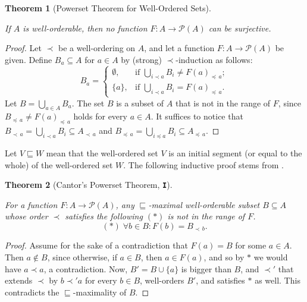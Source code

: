 \documentclass[12pt]{article}
\newtheorem{theorem}{Theorem}[]
\begin{document}
\begin{theorem}[Powerset Theorem for Well-Ordered Sets]
\,

\noindent
  If $A$ is well-orderable, then no function $F\colon A\rightarrow\mathscr{P}(A)$ can be surjective.
\end{theorem}

\begin{proof}

\noindent
Let $\prec$ be a well-ordering on $A$, and let a function $F\colon A\rightarrow\mathscr{P}(A)$ be given. Define  $B_a\subseteq A$ for $a\in A$ by (strong) $\prec$-induction as follows: $$B_a=\begin{cases}
                  \emptyset, & \mbox{if }  \bigcup_{i\prec a}B_i \neq F(a)_{\preccurlyeq\,a}; \\
                 \{a\}, & \mbox{if }  \bigcup_{i\prec a}B_i = F(a)_{\preccurlyeq\,a}.
               \end{cases}$$
Let $B=\bigcup_{a\in A}B_a$. The set $B$ is a subset of $A$ that is not in the range of $F$, since $B_{\preccurlyeq\,a}\neq F(a)_{\preccurlyeq\,a}$ holds for every $a\in A$. It suffices to notice that
$B_{\prec\,a}=\bigcup_{i\prec a}B_i\subseteq A_{\prec\,a}$ and
$B_{\preccurlyeq\,a}=\bigcup_{i\preccurlyeq a}B_i\subseteq A_{\preccurlyeq\,a}$.
\end{proof}

Let $V\sqsubseteq W$ mean that the well-ordered set $V$ is an initial segment (or equal to the whole) of the well-ordered set $W$.
The following inductive proof stems from \textbf{\cite{B97}}.



\begin{theorem}[Cantor's Powerset Theorem, \texttt{\textbf{I}}]
\,

\noindent
For a function $F\colon A\rightarrow\mathscr{P}(A)$, any $\sqsubseteq$-maximal well-orderable subset $B\subseteq A$ whose order $\prec$   satisfies the following $(\boldsymbol\ast)$ is not in the range of $F$.
$$(\boldsymbol\ast)\;\forall b\in B: F(b)=B_{\prec\,b}.$$
\end{theorem}

\begin{proof}

\noindent
Assume for the sake of a contradiction that $F(a)=B$ for some $a\in A$. Then $a\not\in B$, since otherwise, if $a\in B$, then $a\in F(a)$, and so by $\boldsymbol\ast$ we would have $a\prec a$, a contradiction. Now, $B'=B\cup\{a\}$ is bigger than $B$, and $\prec'$ that extends $\prec$ by $b\prec'a$ for every $b\in B$, well-orders $B'$, and satisfies $\boldsymbol\ast$ as well.
  This contradicts the $\sqsubseteq$-maximality of $B$.
\end{proof}
\end{document}
